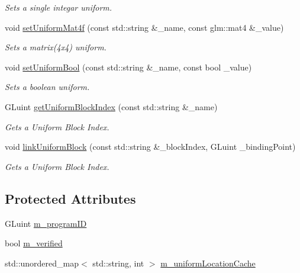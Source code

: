 \begin{DoxyCompactItemize}
\begin{DoxyCompactList}\small\item\em Sets a single integar uniform. \end{DoxyCompactList}\item 
void \hyperlink{class_cookie_eng_1_1_resources_1_1_shader_program_a172752bb917cb141b1a3a1cc44b6a645}{set\+Uniform\+Mat4f} (const std\+::string \&\+\_\+name, const glm\+::mat4 \&\+\_\+value)
\begin{DoxyCompactList}\small\item\em Sets a matrix(4x4) uniform. \end{DoxyCompactList}\item 
void \hyperlink{class_cookie_eng_1_1_resources_1_1_shader_program_aea57a6a608fe57a1057d3a038bac16dd}{set\+Uniform\+Bool} (const std\+::string \&\+\_\+name, const bool \+\_\+value)
\begin{DoxyCompactList}\small\item\em Sets a boolean uniform. \end{DoxyCompactList}\item 
G\+Luint \hyperlink{class_cookie_eng_1_1_resources_1_1_shader_program_a74c040878159bceefb0b6b125a8b3e87}{get\+Uniform\+Block\+Index} (const std\+::string \&\+\_\+name)
\begin{DoxyCompactList}\small\item\em Gets a Uniform Block Index. \end{DoxyCompactList}\item 
void \hyperlink{class_cookie_eng_1_1_resources_1_1_shader_program_af298d334a9c678b7e1c8e32403a91d92}{link\+Uniform\+Block} (const std\+::string \&\+\_\+block\+Index, G\+Luint \+\_\+binding\+Point)
\begin{DoxyCompactList}\small\item\em Gets a Uniform Block Index. \end{DoxyCompactList}\end{DoxyCompactItemize}
\subsection*{Protected Attributes}
\begin{DoxyCompactItemize}
\item 
G\+Luint \hyperlink{class_cookie_eng_1_1_resources_1_1_shader_program_a78e4cd26f128e78c0949476a79ff1c45}{m\+\_\+program\+ID}
\item 
bool \hyperlink{class_cookie_eng_1_1_resources_1_1_shader_program_a826816da20d45149ac950ed64daeda50}{m\+\_\+verified}
\item 
std\+::unordered\+\_\+map$<$ std\+::string, int $>$ \hyperlink{class_cookie_eng_1_1_resources_1_1_shader_program_aba82e0d018c8086308c0cda41e268735}{m\+\_\+uniform\+Location\+Cache}
\end{DoxyCompactItemize}


